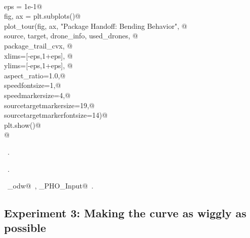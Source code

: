 \documentclass[10.0pt]{report}
\begin{document}
\begin{flushleft}
\begin{minipage}{\linewidth}
\begin{list}{}{}
\mbox{}\verb@@\\
\mbox{}\verb@    eps = 1e-1@\\
\mbox{}\verb@    fig, ax = plt.subplots()@\\
\mbox{}\verb@    plot_tour(fig, ax, "Package Handoff: Bending Behavior", @\\
\mbox{}\verb@                source, target, drone_info, used_drones, @\\
\mbox{}\verb@                package_trail_cvx, @\\
\mbox{}\verb@                xlims=[-eps,1+eps], @\\
\mbox{}\verb@                ylims=[-eps,1+eps], @\\
\mbox{}\verb@                aspect_ratio=1.0,@\\
\mbox{}\verb@                speedfontsize=1,@\\
\mbox{}\verb@                speedmarkersize=4,@\\
\mbox{}\verb@                sourcetargetmarkersize=19,@\\
\mbox{}\verb@                sourcetargetmarkerfontsize=14)@\\
\mbox{}\verb@    plt.show()@\\
\mbox{}\verb@ @\\
\mbox{}\verb@@{\NWsep}
\end{list}
\vspace{-1.5ex}
\footnotesize
\begin{list}{}{\setlength{\itemsep}{-\parsep}\setlength{\itemindent}{-\leftmargin}}
\item \NWtxtMacroDefBy\ .
\item \NWtxtMacroRefIn\ .
\item \NWtxtIdentsUsed\nobreak\  \verb@algo_odw@\nobreak\ , \verb@Single_PHO_Input@\nobreak\ .
\item{}
\end{list}
\end{minipage}\vspace{4ex}
\end{flushleft}



\subsection{Experiment 3: Making the curve as wiggly as possible}
\end{document}
